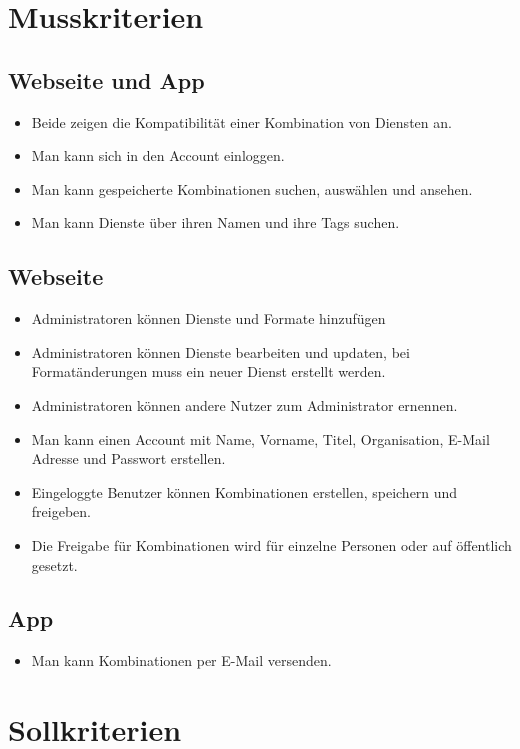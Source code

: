 \section{Musskriterien}
\subsection{Webseite und App}
\begin{itemize}
\item Beide zeigen die Kompatibilität einer Kombination von Diensten an.
\item Man kann sich in den Account einloggen.
\item Man kann gespeicherte Kombinationen suchen, auswählen und ansehen.
\item Man kann Dienste über ihren Namen und ihre Tags suchen.
\end{itemize}

\subsection{Webseite}
\begin{itemize}
\item Administratoren können Dienste und Formate hinzufügen
\item Administratoren können Dienste bearbeiten und updaten, bei Formatänderungen muss ein neuer Dienst erstellt werden.
\item Administratoren können andere Nutzer zum Administrator ernennen.
\item Man kann einen Account mit Name, Vorname, Titel, Organisation, E-Mail Adresse und Passwort erstellen.
\item Eingeloggte Benutzer können Kombinationen erstellen, speichern und freigeben.
\item Die Freigabe für Kombinationen wird für einzelne Personen oder auf öffentlich gesetzt.
\end{itemize}

\subsection{App}
\begin{itemize}
\item Man kann Kombinationen per E-Mail versenden.
\end{itemize}

\section{Sollkriterien}
